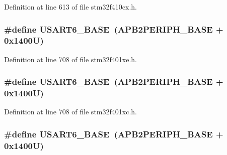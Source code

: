 Definition at line 613 of file stm32f410cx.\+h.

\subsubsection[{\texorpdfstring{U\+S\+A\+R\+T6\+\_\+\+B\+A\+SE}{USART6_BASE}}]{\setlength{\rightskip}{0pt plus 5cm}\#define U\+S\+A\+R\+T6\+\_\+\+B\+A\+SE~({\bf A\+P\+B2\+P\+E\+R\+I\+P\+H\+\_\+\+B\+A\+SE} + 0x1400\+U)}\hypertarget{group___peripheral__registers__structures_gade4d3907fd0387ee832f426f52d568bb}{}\label{group___peripheral__registers__structures_gade4d3907fd0387ee832f426f52d568bb}


Definition at line 708 of file stm32f401xe.\+h.

\subsubsection[{\texorpdfstring{U\+S\+A\+R\+T6\+\_\+\+B\+A\+SE}{USART6_BASE}}]{\setlength{\rightskip}{0pt plus 5cm}\#define U\+S\+A\+R\+T6\+\_\+\+B\+A\+SE~({\bf A\+P\+B2\+P\+E\+R\+I\+P\+H\+\_\+\+B\+A\+SE} + 0x1400\+U)}\hypertarget{group___peripheral__registers__structures_gade4d3907fd0387ee832f426f52d568bb}{}\label{group___peripheral__registers__structures_gade4d3907fd0387ee832f426f52d568bb}


Definition at line 708 of file stm32f401xc.\+h.

\subsubsection[{\texorpdfstring{U\+S\+A\+R\+T6\+\_\+\+B\+A\+SE}{USART6_BASE}}]{\setlength{\rightskip}{0pt plus 5cm}\#define U\+S\+A\+R\+T6\+\_\+\+B\+A\+SE~({\bf A\+P\+B2\+P\+E\+R\+I\+P\+H\+\_\+\+B\+A\+SE} + 0x1400\+U)}\hypertarget{group___peripheral__registers__structures_gade4d3907fd0387ee832f426f52d568bb}{}\label{group___peripheral__registers__structures_gade4d3907fd0387ee832f426f52d568bb}


